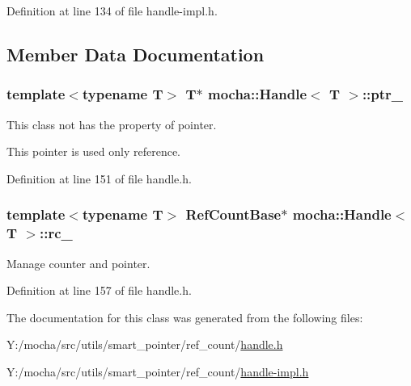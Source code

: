 Definition at line 134 of file handle-\/impl.h.



\subsection{Member Data Documentation}
\hypertarget{classmocha_1_1_handle_a58e82f1bbee46886fee9b433ecbae776}{
\subsubsection[{ptr\_\-}]{\setlength{\rightskip}{0pt plus 5cm}template$<$typename T$>$ T$\ast$ {\bf mocha::Handle}$<$ T $>$::{\bf ptr\_\-}}}
\label{classmocha_1_1_handle_a58e82f1bbee46886fee9b433ecbae776}


This class not has the property of pointer. 

This pointer is used only reference. 

Definition at line 151 of file handle.h.

\hypertarget{classmocha_1_1_handle_a97ddcc3a71592fcd487ef19f837e6b62}{
\subsubsection[{rc\_\-}]{\setlength{\rightskip}{0pt plus 5cm}template$<$typename T$>$ {\bf RefCountBase}$\ast$ {\bf mocha::Handle}$<$ T $>$::{\bf rc\_\-}}}
\label{classmocha_1_1_handle_a97ddcc3a71592fcd487ef19f837e6b62}


Manage counter and pointer. 



Definition at line 157 of file handle.h.



The documentation for this class was generated from the following files:\begin{DoxyCompactItemize}
\item 
Y:/mocha/src/utils/smart\_\-pointer/ref\_\-count/\hyperlink{handle_8h}{handle.h}\item 
Y:/mocha/src/utils/smart\_\-pointer/ref\_\-count/\hyperlink{handle-impl_8h}{handle-\/impl.h}\end{DoxyCompactItemize}
